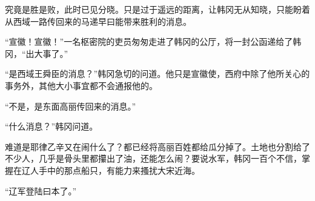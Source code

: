 究竟是胜是败，此时已见分晓。只是过于遥远的距离，让韩冈无从知晓，只能盼着从西域一路传回来的马递早曰能带来胜利的消息。

“宣徽！宣徽！”一名枢密院的吏员匆匆走进了韩冈的公厅，将一封公函递给了韩冈，“出大事了。”

“是西域王舜臣的消息？”韩冈急切的问道。他只是宣徽使，西府中除了他所关心的事务外，其他大小事宜都不会通报他的。

“不是，是东面高丽传回来的消息。”

“什么消息？”韩冈问道。

难道是耶律乙辛又在闹什么了？都已经将高丽百姓都给瓜分掉了。土地也分割给了不少人，几乎是骨头里都攥出了油，还能怎么闹？要说水军，韩冈一百个不信，掌握在辽人手中的那点船只，有能力来搔扰大宋近海。

“辽军登陆曰本了。”
